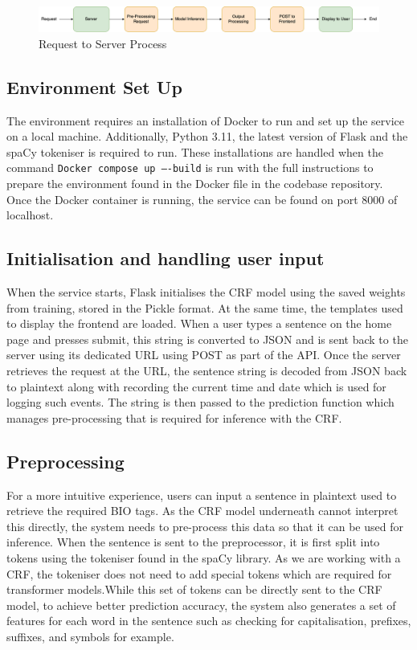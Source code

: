 \documentclass{surreydissertation}
\begin{document}
\begin{figure}[H]
    \centering
    \includegraphics[width=1\textwidth]{Figures/NLPsystemoverview1.png}
    \caption{Request to Server Process}
    \label{fig:NLPsystemoverview1}
 \end{figure}

\subsection{Environment Set Up}
The environment requires an installation of Docker to run and set up the service on a local machine. Additionally, Python 3.11, the latest version of Flask and the spaCy tokeniser is required to run. These installations are handled when the command \texttt{Docker compose up –-build} is run with the full instructions to prepare the environment found in the Docker file in the codebase repository. Once the Docker container is running, the service can be found on port 8000 of localhost. 

\subsection{Initialisation and handling user input}
When the service starts, Flask initialises the CRF model using the saved weights from training, stored in the Pickle format. At the same time, the templates used to display the frontend are loaded. When a user types a sentence on the home page and presses submit, this string is converted to JSON and is sent back to the server using its dedicated URL using POST as part of the API. Once the server retrieves the request at the URL, the sentence string is decoded from JSON back to plaintext along with recording the current time and date which is used for logging such events. The string is then passed to the prediction function which manages pre-processing that is required for inference with the CRF.

\subsection{Preprocessing}
For a more intuitive experience, users can input a sentence in plaintext used to retrieve the required BIO tags. As the CRF model underneath cannot interpret this directly, the system needs to pre-process this data so that it can be used for inference. When the sentence is sent to the preprocessor, it is first split into tokens using the tokeniser found in the spaCy library. As we are working with a CRF, the tokeniser does not need to add special tokens which are required for transformer models.While this set of tokens can be directly sent to the CRF model, to achieve better prediction accuracy, the system also generates a set of features for each word in the sentence such as checking for capitalisation, prefixes, suffixes, and symbols for example.
\end{document}
